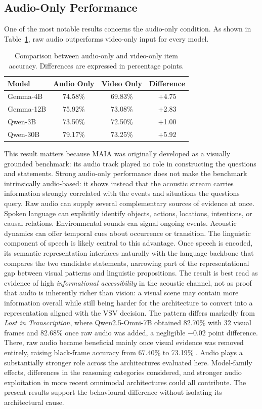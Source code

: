 \subsection*{Audio-Only Performance}
\label{subsec:audio_only}
One of the most notable results concerns the audio-only condition. As shown in Table~\ref{tab:audio_vs_video}, raw audio outperforms video-only input for every model.
\begin{table}[h]
    \centering
    \small
    \begin{tabular}{lccc}
        \hline
        \textbf{Model} &
        \textbf{Audio Only} &
        \textbf{Video Only} &
        \textbf{Difference} \\
        \hline
        Gemma-4B    & 74.58\% & 69.83\% & +4.75 \\
        Gemma-12B & 75.92\% & 73.08\% & +2.83 \\
        Qwen-3B & 73.50\% & 72.50\% & +1.00 \\
        Qwen-30B & 79.17\% & 73.25\% & +5.92 \\
        \hline
    \end{tabular}
    \caption{Comparison between audio-only and video-only item accuracy. Differences are expressed in percentage points.}
    \label{tab:audio_vs_video}
\end{table}
This result matters because MAIA was originally developed as a visually grounded benchmark: its audio track played no role in constructing the questions and statements. Strong audio-only performance does not make the benchmark intrinsically audio-based: it shows instead that the acoustic stream carries information strongly correlated with the events and situations the questions query. Raw audio can supply several complementary sources of evidence at once. Spoken language can explicitly identify objects, actions, locations, intentions, or causal relations. Environmental sounds can signal ongoing events. Acoustic dynamics can offer temporal cues about occurrence or transition.
The linguistic component of speech is likely central to this advantage. Once speech is encoded, its semantic representation interfaces naturally with the language backbone that compares the two candidate statements, narrowing part of the representational gap between visual patterns and linguistic propositions. The result is best read as evidence of high \textit{informational accessibility} in the acoustic channel, not as proof that audio is inherently richer than vision: a visual scene may contain more information overall while still being harder for the architecture to convert into a representation aligned with the VSV decision.
The pattern differs markedly from \textit{Lost in Transcription}, where Qwen2.5-Omni-7B obtained 82.70\% with 32 visual frames and 82.68\% once raw audio was added, a negligible $-0.02$ point difference. There, raw audio became beneficial mainly once visual evidence was removed entirely, raising black-frame accuracy from 67.40\% to 73.19\% \cite{deodati2026lost}. Audio plays a substantially stronger role across the architectures evaluated here. Model-family effects, differences in the reasoning categories considered, and stronger audio exploitation in more recent omnimodal architectures could all contribute. The present results support the behavioural difference without isolating its architectural cause.
